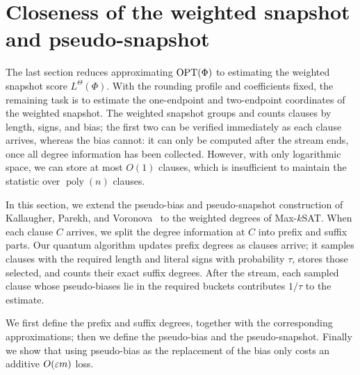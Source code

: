 \section{Closeness of the weighted snapshot and pseudo-snapshot}
\label{sec:weighted-pseudosnapshot-closeness}

The last  section reduces approximating $\operatorname{OPT}(\Phi)$ to estimating the weighted snapshot score $L^{\Theta}(\Phi)$.
With the rounding profile and coefficients fixed, the remaining task is to estimate the one-endpoint and two-endpoint coordinates of the weighted snapshot.
The weighted snapshot groups and counts clauses by length, signs, and bias; the first two can be verified immediately as each clause arrives, whereas  the bias cannot: it can only be computed after the stream ends, once all degree information has been collected. However, with only logarithmic space, we can store at most \(O(1)\) clauses, which is insufficient to maintain the statistic over \(\operatorname{poly}(n)\) clauses.






In this section, we extend the pseudo-bias and pseudo-snapshot construction of Kallaugher, Parekh, and Voronova~\cite{KPV23} to the weighted degrees of Max-$k$SAT.
When each clause \(C\) arrives, we split the degree information at \(C\) into prefix and suffix parts.
Our quantum algorithm updates prefix degrees as clauses arrive; it  samples clauses with the required length and literal signs with probability $\tau$, stores those selected, and counts their exact suffix degrees.
After the stream, each sampled clause whose pseudo-biases lie in the required buckets contributes $1/\tau$ to the estimate.

We first define the prefix and suffix degrees,  together with the corresponding approximations; then we  define the pseudo-bias and the  pseudo-snapshot. 
Finally we show that using pseudo-bias as the replacement of the bias only costs an additive $O(\varepsilon m)$ loss.



